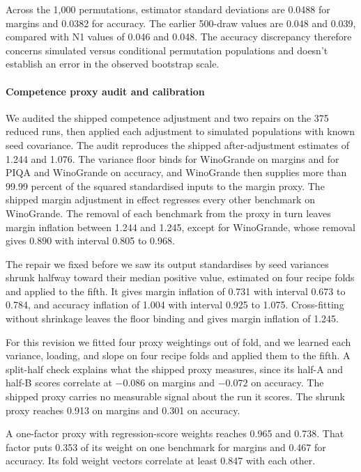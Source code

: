 Across the 1,000 permutations, estimator standard deviations are 0.0488 for margins and 0.0382 for accuracy. The earlier 500-draw values are 0.048 and 0.039, compared with N1 values of 0.046 and 0.048. The accuracy discrepancy therefore concerns simulated versus conditional permutation populations and doesn't establish an error in the observed bootstrap scale.


\paragraph{Competence proxy audit and calibration}
\label{app:proxy}
We audited the shipped competence adjustment and two repairs on the 375 reduced runs, then applied each adjustment to simulated populations with known seed covariance. The audit reproduces the shipped after-adjustment estimates of 1.244 and 1.076. The variance floor binds for WinoGrande on margins and for PIQA and WinoGrande on accuracy, and WinoGrande then supplies more than 99.99 percent of the squared standardised inputs to the margin proxy. The shipped margin adjustment in effect regresses every other benchmark on WinoGrande. The removal of each benchmark from the proxy in turn leaves margin inflation between 1.244 and 1.245, except for WinoGrande, whose removal gives 0.890 with interval 0.805 to 0.968.

The repair we fixed before we saw its output standardises by seed variances shrunk halfway toward their median positive value, estimated on four recipe folds and applied to the fifth. It gives margin inflation of 0.731 with interval 0.673 to 0.784, and accuracy inflation of 1.004 with interval 0.925 to 1.075. Cross-fitting without shrinkage leaves the floor binding and gives margin inflation of 1.245.

For this revision we fitted four proxy weightings out of fold, and we learned each variance, loading, and slope on four recipe folds and applied them to the fifth. A split-half check explains what the shipped proxy measures, since its half-A and half-B scores correlate at $-0.086$ on margins and $-0.072$ on accuracy. The shipped proxy carries no measurable signal about the run it scores. The shrunk proxy reaches 0.913 on margins and 0.301 on accuracy.

A one-factor proxy with regression-score weights reaches 0.965 and 0.738. That factor puts 0.353 of its weight on one benchmark for margins and 0.467 for accuracy. Its fold weight vectors correlate at least 0.847 with each other.

